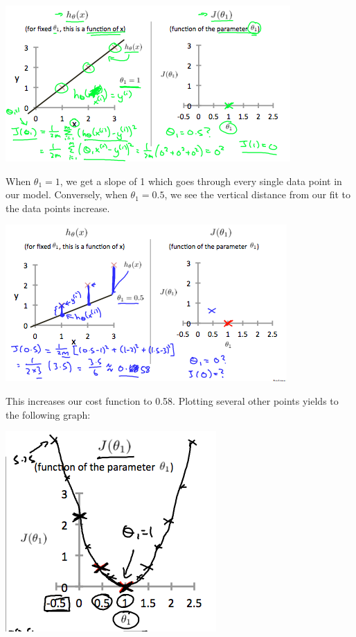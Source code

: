 \documentclass[UTF8]{article}
\begin{document}
\includegraphics[width = .8\textwidth]{NotePics/2_2_1_1.png}

When $\theta_1=1$, we get a slope of 1 which goes through every single data point in our model. Conversely, when $\theta_1=0.5$, we see the vertical distance from our fit to the data points increase.

\includegraphics[width = .8\textwidth]{NotePics/2_2_1_2.png}

This increases our cost function to 0.58. Plotting several other points yields to the following graph:

\includegraphics[width = .8\textwidth]{NotePics/2_2_1_3.png}
\end{document}
